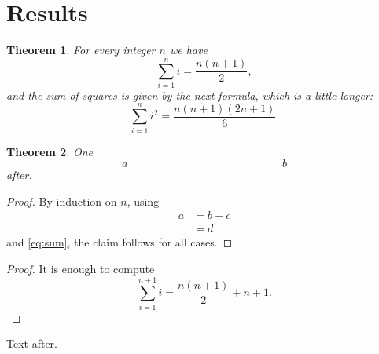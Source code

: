 \documentclass{article}
\newtheorem{theorem}{Theorem}
\begin{document}
\section{Results}
\begin{theorem}\label{thm:a}
For every integer $n$ we have
\begin{equation}\label{eq:sum}
\sum_{i=1}^n i = \frac{n(n+1)}{2},
\end{equation}
and the sum of squares is given by the next formula, which is a little longer:
\begin{equation*}
\sum_{i=1}^n i^2 = \frac{n(n+1)(2n+1)}{6}.
\end{equation*}
\end{theorem}
\begin{theorem}
One
\[ a\quad\quad\quad\quad\quad\quad\quad\quad\quad\quad\quad\quad\quad\;\;\;\:\!b \]
after.
\end{theorem}
\begin{proof}
By induction on $n$, using
\begin{align}
a &= b + c \\
  &= d
\end{align}
and \eqref{eq:sum}, the claim follows for all cases.
\end{proof}
\begin{proof}
It is enough to compute
\[ \sum_{i=1}^{n+1} i = \frac{n(n+1)}{2} + n + 1. \]
\end{proof}
Text after.
\end{document}
